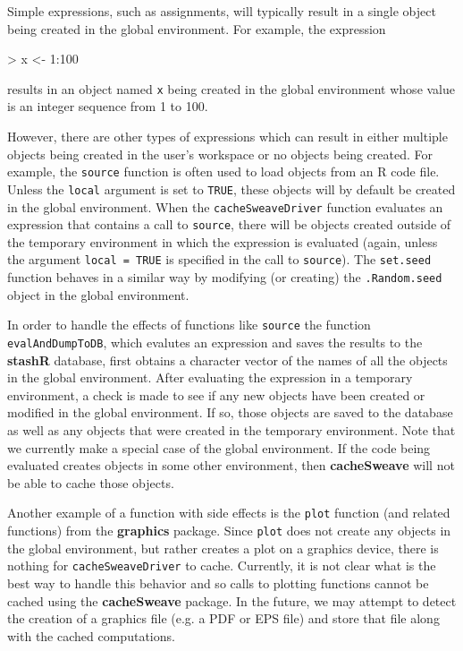 \documentclass{article}
\newcommand{\proglang}{\textsf}
\newcommand{\code}{\texttt}
\newcommand{\pkg}{\textbf}
\begin{document}
Simple expressions, such as assignments, will typically result in a
single object being created in the global environment.  For example,
the expression
\begin{Schunk}
\begin{Sinput}
> x <- 1:100
\end{Sinput}
\end{Schunk}
results in an object named \code{x} being created in the global
environment whose value is an integer sequence from 1 to 100.

However, there are other types of expressions which can result in
either multiple objects being created in the user's workspace or no
objects being created.  For example, the \code{source} function is
often used to load objects from an \proglang{R} code file.  Unless the
\code{local} argument is set to \code{TRUE}, these objects will by
default be created in the global environment.  When the
\code{cacheSweaveDriver} function evaluates an expression that
contains a call to \code{source}, there will be objects created
outside of the temporary environment in which the expression is
evaluated (again, unless the argument \code{local = TRUE} is specified
in the call to \code{source}).  The \code{set.seed} function behaves
in a similar way by modifying (or creating) the \code{.Random.seed}
object in the global environment.

In order to handle the effects of functions like \code{source} the
function \code{evalAndDumpToDB}, which evalutes an expression and
saves the results to the \pkg{stashR} database, first obtains a
character vector of the names of all the objects in the global
environment.  After evaluating the expression in a temporary
environment, a check is made to see if any new objects have been
created or modified in the global environment.  If so, those objects
are saved to the database as well as any objects that were created in
the temporary environment.  Note that we currently make a special case
of the global environment.  If the code being evaluated creates
objects in some other environment, then \pkg{cacheSweave} will not be
able to cache those objects.

Another example of a function with side effects is the \code{plot}
function (and related functions) from the \pkg{graphics} package.
Since \code{plot} does not create any objects in the global
environment, but rather creates a plot on a graphics device, there is
nothing for \code{cacheSweaveDriver} to cache.  Currently, it is not
clear what is the best way to handle this behavior and so calls to
plotting functions cannot be cached using the \pkg{cacheSweave}
package.  In the future, we may attempt to detect the creation of a
graphics file (e.g. a PDF or EPS file) and store that file along with
the cached computations.
\end{document}
